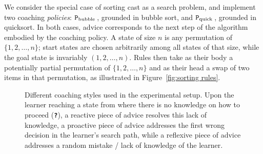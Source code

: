 \documentclass[a4paper,twoside]{article}
\newcommand{\bubblecoach}{\ensuremath{\texttt{P}_{\rm bubble}}\,}
\newcommand{\quickcoach}{\ensuremath{\texttt{P}_{\rm quick}}\,}
\newcommand{\qmark}{\texttt{\textbf{?}}}
\begin{document}
We consider the special case of sorting cast as a search problem, and implement two coaching \emph{policies}: \bubblecoach, grounded in bubble sort, and \quickcoach, grounded in quicksort. In both cases, advice corresponds to the next step of the algorithm embodied by the coaching policy. A state of size $n$ is any permutation of $\{1,2,\ldots,n\}$; start states are chosen arbitrarily among all states of that size, while the goal state is invariably $(1,2,\ldots,n)$. Rules then take as their body a potentially partial permutation of $\{1,2,\ldots,n\}$ and as their head a swap of two items in that permutation, as illustrated in Figure~\ref{fig:sorting rules}.

\begin{figure}[!tb]
	\centering
	
	\caption{Different coaching styles used in the experimental setup. Upon the learner reaching a state from where there is no knowledge on how to proceed (\textcolor{unknownColor}{\qmark}), a reactive piece of advice resolves this lack of knowledge, a proactive piece of advice addresses the first wrong decision in the learner's search path, while a reflexive piece of advice addresses a random mistake / lack of knowledge of the learner.}
	\label{fig:coaching styles}
\end{figure}
\end{document}
